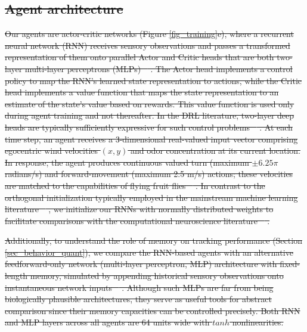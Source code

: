 \documentclass[5p,twocolumn,authoryear]{elsarticle}
\providecommand{\DIFdeltex}[1]{{\protect\color{red}\sout{#1}}}                      %
\providecommand{\DIFdel}[1]{\texorpdfstring{\DIFdeltex{#1}}{}} %
\begin{document}
\subsection{\DIFdel{Agent architecture}}
\addtocounter{subsection}{-1}%
\DIFdel{Our agents are actor-critic networks (Figure \ref{fig_training}e), where a recurrent neural network (RNN) receives sensory observations and passes a transformed representation of them onto parallel Actor and Critic heads
that are both two-layer multi-layer perceptrons (MLPs) \mbox{%
\citep{konda2000actor}}\hspace{0pt}%
.
The Actor head implements a control policy to map the RNN's learned state representation to actions, while the Critic head implements a value function that maps the state representation to an estimate of the state's value based on rewards.
This value function is used only during agent training and not thereafter.
In the DRL literature, two-layer deep heads are typically sufficiently expressive for such control problems \mbox{%
\citep{hill2018stable}}\hspace{0pt}%
.
At each time step, an agent receives a 3-dimensional real-valued input vector comprising egocentric wind velocities $(x, y)$ and odor concentration at its current location.
In response, the agent produces continuous valued turn (maximum $\pm  6.25 \pi$ radians/s) and forward-movement (maximum 2.5 m/s) actions; these velocities are matched to the capabilities of flying fruit flies \mbox{%
\citep{van2014plume,van2008insects}}\hspace{0pt}%
.
In contrast to the orthogonal initialization typically employed in the mainstream machine learning literature \mbox{%
\citep{henaff2016recurrent}}\hspace{0pt}%
, we initialize our RNNs with normally distributed weights to facilitate comparisons with the computational neuroscience literature \mbox{%
\citep{vogels2005neural,sussillo2014neural,yang2019task}}\hspace{0pt}%
. 
}%

\DIFdel{Additionally, to understand the role of memory on tracking performance (Section \ref{sec_behavior_quant}), we compare the RNN-based agents with an alternative feedforward-only network (multi-layer perceptron, MLP) architecture with fixed-length memory, simulated by appending historical sensory observations onto instantaneous network inputs \mbox{%
\citep{mnih2013playing}}\hspace{0pt}%
.
Although such MLPs are far from being biologically plausible architectures, they serve as useful tools for abstract comparison since their memory capacities can be controlled precisely. 
Both RNN and MLP layers across all agents are 64 units wide with $tanh$ nonlinearities.
}%
\end{document}
